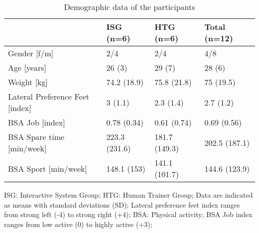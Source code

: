 \begin{table}[]
\centering
  \begin{threeparttable}
\caption{Demographic data of the participants}
\label{tableDemographic}
\begin{tabular}{@{}llll@{}}
\toprule
                                & ISG (n=6)     & HTG (n=6)     & Total (n=12)  \\ \midrule
Gender [f/m]                    & 2/4           & 2/4           & 4/8           \\
Age [years]                     & 26 (3)        & 29 (7)        & 28 (6)        \\
Weight [kg]                     & 74.2 (18.9)   & 75.8 (21.8)   & 75 (19.5)     \\
Lateral Preference Feet [index] & 3 (1.1)       & 2.3 (1.4)     & 2.7 (1.2)     \\
BSA Job [index]                 & 0.78 (0.34)   & 0.61 (0.74)   & 0.69 (0.56)   \\
BSA Spare time [min/week]       & 223.3 (231.6) & 181.7 (149.3) & 202.5 (187.1) \\
BSA Sport [min/week]            & 148.1 (153)   & 141.1 (101.7) & 144.6 (123.9) \\ \bottomrule
\end{tabular}
    \begin{tablenotes}
      \small
      \item ISG: Interactive System Group; HTG: Human Trainer Group; Data are indicated as means with standard deviations (SD); Lateral preference feet index ranges from strong left (-4) to strong right (+4); BSA: Physical activity; BSA Job index ranges from low active (0) to highly active (+3);
    \end{tablenotes}
  \end{threeparttable}
\end{table}
